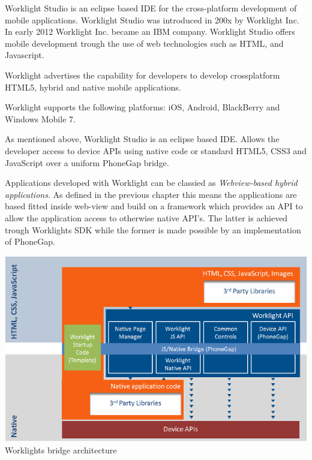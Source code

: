 \pagebreak

Worklight Studio is an eclipse based IDE for the cross-platform development of mobile applications. Worklight Studio was introduced in 200x by Worklight Inc. In early 2012 Worklight Inc. became an IBM company. Worklight Studio offers mobile development trough the use of web technologies such as HTML, and Javascript.

Worklight advertises the capability for developers to develop crossplatform HTML5, hybrid and native mobile applications.


Worklight supports the following platforms: iOS, Android, BlackBerry and Windows Mobile 7.

As mentioned above, Worklight Studio is an eclipse based IDE.
Allows the developer access to device APIs using native code or standard HTML5, CSS3 and JavaScript over a uniform PhoneGap bridge.


Applications developed with Worklight can be classied as \emph{Webview-based hybrid applications}. As defined in the previous chapter this means the applications are based fitted inside web-view and build on a framework which provides an API to allow the application access to otherwise native API's. The latter is achieved trough Worklights SDK while the former is made possible by an implementation of PhoneGap. \cite{Inc2012}

\begin{centering}
  \includegraphics[scale=0.4]{images/Worklight_architecture.png}\\{Worklights bridge architecture\cite{Inc2012a}}\\
\end{centering}

